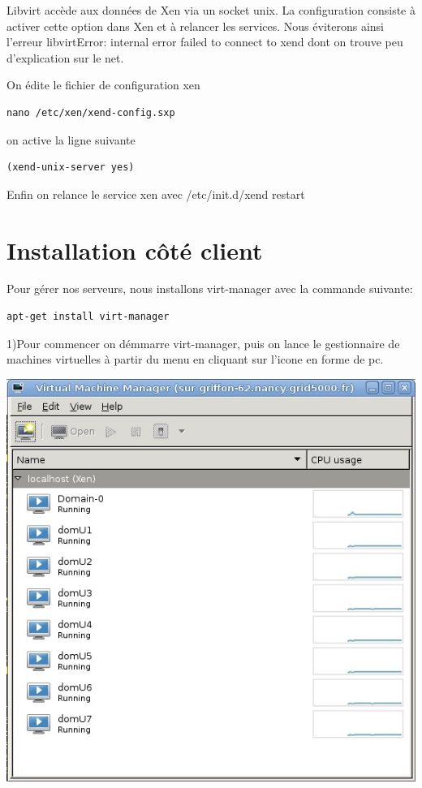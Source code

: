 Libvirt accède aux données de Xen via un socket unix. La configuration consiste à activer cette option dans Xen et à relancer les services.
Nous éviterons ainsi l’erreur libvirtError: internal error failed to connect to xend dont on trouve peu d’explication sur le net.

On édite le fichier de configuration xen
\begin{lstlisting} 
nano /etc/xen/xend-config.sxp
\end{lstlisting}
 on active la ligne suivante
\begin{lstlisting} 
(xend-unix-server yes)
\end{lstlisting}
 Enfin on relance le service xen avec /etc/init.d/xend restart

\section{Installation côté client}
Pour gérer nos serveurs, nous installons virt-manager avec la commande suivante:
\begin{lstlisting} 
apt-get install virt-manager
\end{lstlisting}


1)Pour commencer on démmarre virt-manager, puis on lance le gestionnaire de machines virtuelles à partir du menu en cliquant sur l'icone en forme de pc.

\includegraphics{images/virt.jpg}

